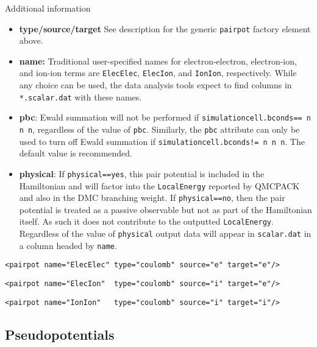 Additional information
\begin{itemize}
  \item{\textbf{type/source/target} See description for the generic \texttt{pairpot} factory element above.}
  \item{\textbf{name:} Traditional user-specified names for electron-electron, electron-ion, and ion-ion terms are \texttt{ElecElec}, \texttt{ElecIon}, and \texttt{IonIon}, respectively.  While any choice can be used, the data analysis tools expect to find columns in \texttt{*.scalar.dat} with these names.}
  \item{\textbf{pbc}: Ewald summation will not be performed if \texttt{simulationcell.bconds== n n n}, regardless of the value of \texttt{pbc}.  Similarly, the \texttt{pbc} attribute can only be used to turn off Ewald summation if \texttt{simulationcell.bconds!= n n n}.  The default value is recommended.}
  \item{\textbf{physical}: If \texttt{physical==yes}, this pair potential is included in the Hamiltonian and will factor into the \texttt{LocalEnergy} reported by QMCPACK and also in the DMC branching weight.  If \texttt{physical==no}, then the pair potential is treated as a passive observable but not as part of the Hamiltonian itself.  As such it does not contribute to the outputted \texttt{LocalEnergy}.  Regardless of the value of \texttt{physical} output data will appear in \texttt{scalar.dat} in a column headed by \texttt{name}.}
\end{itemize}


\begin{lstlisting}[caption=XML element for Coulomb interaction between electrons.]
  <pairpot name="ElecElec" type="coulomb" source="e" target="e"/>
\end{lstlisting}

\begin{lstlisting}[caption=XML element for Coulomb interaction between electrons and ions (all-electron only).]
  <pairpot name="ElecIon"  type="coulomb" source="i" target="e"/>
\end{lstlisting}

\begin{lstlisting}[caption=XML element for Coulomb interaction between ions.]
  <pairpot name="IonIon"   type="coulomb" source="i" target="i"/>
\end{lstlisting}


\subsection{Pseudopotentials}

